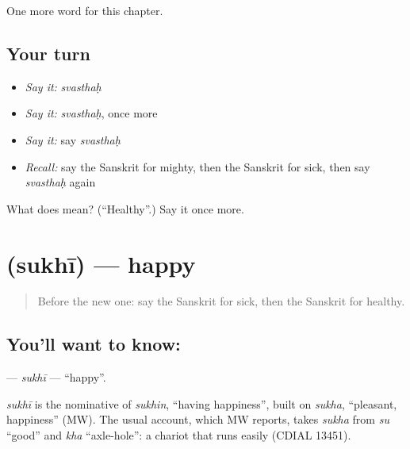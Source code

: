 \begin{grammarlens}[title={What you've built}]
One more word for this chapter.
\end{grammarlens}

\subsection*{Your turn}
\begin{itemize}
\raggedright
  \item \emph{Say it:} \emph{svasthaḥ}
  \item \emph{Say it:} \emph{svasthaḥ}, once more
  \item \emph{Say it:} say \emph{svasthaḥ}
  \item \emph{Recall:} say the Sanskrit for mighty, then the Sanskrit for sick, then say \emph{svasthaḥ} again
\end{itemize}

\begin{tcolorbox}[breakable,colback=teal!4,colframe=teal!35!black,title={Before you move on}]
What does  mean? (\textquotedblleft{}Healthy\textquotedblright{}.) Say it once more.
\end{tcolorbox}
\section[\texorpdfstring{\sk{सुखी} (sukhī)}{सुखी (sukhī)}]{ (sukhī) — happy}

\label{lesson:SA-C243-sukhi}



\begin{quote}
Before the new one: say the Sanskrit for sick, then the Sanskrit for healthy.
\end{quote}

\subsection*{You'll want to know: }
\textbf{} — \emph{sukhī} — \textquotedblleft{}happy\textquotedblright{}.

\begin{cousinweb}
\emph{sukhī} is the nominative of \emph{sukhin}, \textquotedblleft{}having happiness\textquotedblright{}, built on \emph{sukha}, \textquotedblleft{}pleasant, happiness\textquotedblright{} (MW). The usual account, which MW reports, takes \emph{sukha} from \emph{su} \textquotedblleft{}good\textquotedblright{} and \emph{kha} \textquotedblleft{}axle-hole\textquotedblright{}: a chariot that runs easily (CDIAL 13451).
\end{cousinweb}


